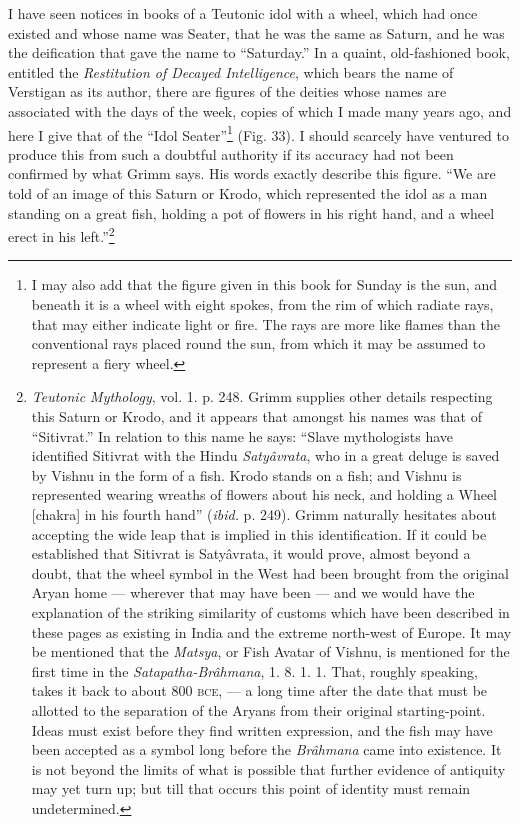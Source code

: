 \documentclass[a4paper, 11pt, oneside, polutonikogreek, english]{article}
\begin{document}
I have seen notices in books of a Teutonic idol with a wheel, which had once existed and whose name was Seater, that he was the same as Saturn, and he was the deification that gave the name to ``Saturday.'' In a quaint, old-fashioned book, entitled the \emph{Restitution of Decayed Intelligence}, which bears the name of Verstigan as its author, there are figures of the deities whose names are associated with the days of the week, copies of which I made many years ago, and here I give that of the ``Idol Seater''\footnote{I may also add that the figure given in this book for Sunday is the sun, and beneath it is a wheel with eight spokes, from the rim of which radiate rays, that may either indicate light or fire. The rays are more like flames than the conventional rays placed round the sun, from which it may be assumed to represent a fiery wheel.} (Fig. 33). I should scarcely have ventured to produce this from such a doubtful authority if its accuracy had not been confirmed by what Grimm says. His words exactly describe this figure. ``We are told of an image of this Saturn or Krodo, which represented the idol as a man standing on a great fish, holding a pot of flowers in his right hand, and a wheel erect in his left.''\footnote{\emph{Teutonic Mythology}, vol. 1. p. 248. Grimm supplies other details respecting this Saturn or Krodo, and it appears that amongst his names was that of ``Sitivrat.'' In relation to this name he says: ``Slave mythologists have identified Sitivrat with the Hindu \emph{Satyâvrata}, who in a great deluge is saved by Vishnu in the form of a fish. Krodo stands on a fish; and Vishnu is represented wearing wreaths of flowers about his neck, and holding a Wheel [chakra] in his fourth hand'' (\emph{ibid.} p. 249). Grimm naturally hesitates about accepting the wide leap that is implied in this identification. If it could be established that Sitivrat is Satyâvrata, it would prove, almost beyond a doubt, that the wheel symbol in the West had been brought from the original Aryan home --- wherever that may have been --- and we would have the explanation of the striking similarity of customs which have been described in these pages as existing in India and the extreme north-west of Europe. It may be mentioned that the \emph{Matsya}, or Fish Avatar of Vishnu, is mentioned for the first time in the \emph{Satapatha-Brâhmana}, 1. 8. 1. 1. That, roughly speaking, takes it back to about 800 \textsc{bce}, --- a long time after the date that must be allotted to the separation of the Aryans from their original starting-point. Ideas must exist before they find written expression, and the fish may have been accepted as a symbol long before the \emph{Brâhmana} came into existence. It is not beyond the limits of what is possible that further evidence of antiquity may yet turn up; but till that occurs this point of identity must remain undetermined.}
\end{document}
